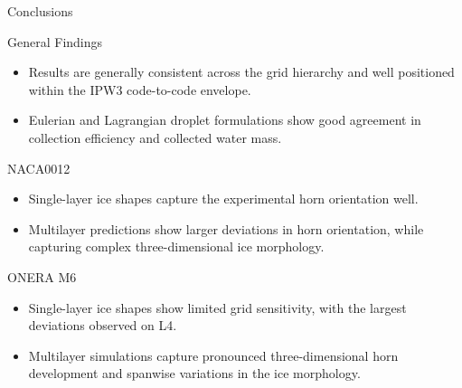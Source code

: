 


\begin{frame}{\small Conclusions}
\scriptsize

\begin{block}{\scriptsize General Findings}
\begin{itemize}
    \item Results are generally consistent across the grid hierarchy and well positioned within the IPW3 code-to-code envelope.
    \item Eulerian and Lagrangian droplet formulations show good agreement in collection efficiency and collected water mass.
\end{itemize}
\end{block}

\vspace{0.12cm}

\begin{block}{\scriptsize NACA0012}
\begin{itemize}
    \item Single-layer ice shapes capture the experimental horn orientation well.
    \item Multilayer predictions show larger deviations in horn orientation, while capturing complex three-dimensional ice morphology.
\end{itemize}
\end{block}

\vspace{0.12cm}

\begin{block}{\scriptsize ONERA M6}
\begin{itemize}
    \item Single-layer ice shapes show limited grid sensitivity, with the largest deviations observed on L4.
    \item Multilayer simulations capture pronounced three-dimensional horn development and spanwise variations in the ice morphology.
\end{itemize}
\end{block}


\end{frame}
